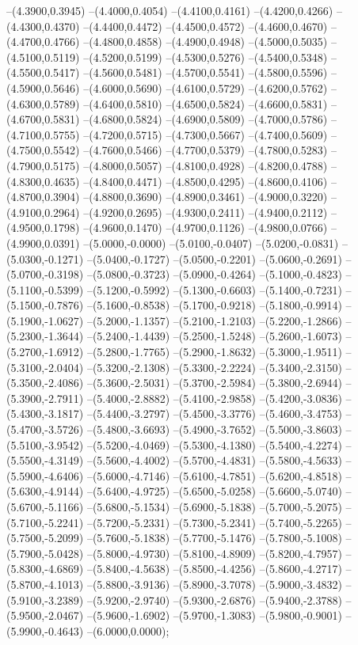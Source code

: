 	--(4.3900,0.3945)
	--(4.4000,0.4054)
	--(4.4100,0.4161)
	--(4.4200,0.4266)
	--(4.4300,0.4370)
	--(4.4400,0.4472)
	--(4.4500,0.4572)
	--(4.4600,0.4670)
	--(4.4700,0.4766)
	--(4.4800,0.4858)
	--(4.4900,0.4948)
	--(4.5000,0.5035)
	--(4.5100,0.5119)
	--(4.5200,0.5199)
	--(4.5300,0.5276)
	--(4.5400,0.5348)
	--(4.5500,0.5417)
	--(4.5600,0.5481)
	--(4.5700,0.5541)
	--(4.5800,0.5596)
	--(4.5900,0.5646)
	--(4.6000,0.5690)
	--(4.6100,0.5729)
	--(4.6200,0.5762)
	--(4.6300,0.5789)
	--(4.6400,0.5810)
	--(4.6500,0.5824)
	--(4.6600,0.5831)
	--(4.6700,0.5831)
	--(4.6800,0.5824)
	--(4.6900,0.5809)
	--(4.7000,0.5786)
	--(4.7100,0.5755)
	--(4.7200,0.5715)
	--(4.7300,0.5667)
	--(4.7400,0.5609)
	--(4.7500,0.5542)
	--(4.7600,0.5466)
	--(4.7700,0.5379)
	--(4.7800,0.5283)
	--(4.7900,0.5175)
	--(4.8000,0.5057)
	--(4.8100,0.4928)
	--(4.8200,0.4788)
	--(4.8300,0.4635)
	--(4.8400,0.4471)
	--(4.8500,0.4295)
	--(4.8600,0.4106)
	--(4.8700,0.3904)
	--(4.8800,0.3690)
	--(4.8900,0.3461)
	--(4.9000,0.3220)
	--(4.9100,0.2964)
	--(4.9200,0.2695)
	--(4.9300,0.2411)
	--(4.9400,0.2112)
	--(4.9500,0.1798)
	--(4.9600,0.1470)
	--(4.9700,0.1126)
	--(4.9800,0.0766)
	--(4.9900,0.0391)
	--(5.0000,-0.0000)
	--(5.0100,-0.0407)
	--(5.0200,-0.0831)
	--(5.0300,-0.1271)
	--(5.0400,-0.1727)
	--(5.0500,-0.2201)
	--(5.0600,-0.2691)
	--(5.0700,-0.3198)
	--(5.0800,-0.3723)
	--(5.0900,-0.4264)
	--(5.1000,-0.4823)
	--(5.1100,-0.5399)
	--(5.1200,-0.5992)
	--(5.1300,-0.6603)
	--(5.1400,-0.7231)
	--(5.1500,-0.7876)
	--(5.1600,-0.8538)
	--(5.1700,-0.9218)
	--(5.1800,-0.9914)
	--(5.1900,-1.0627)
	--(5.2000,-1.1357)
	--(5.2100,-1.2103)
	--(5.2200,-1.2866)
	--(5.2300,-1.3644)
	--(5.2400,-1.4439)
	--(5.2500,-1.5248)
	--(5.2600,-1.6073)
	--(5.2700,-1.6912)
	--(5.2800,-1.7765)
	--(5.2900,-1.8632)
	--(5.3000,-1.9511)
	--(5.3100,-2.0404)
	--(5.3200,-2.1308)
	--(5.3300,-2.2224)
	--(5.3400,-2.3150)
	--(5.3500,-2.4086)
	--(5.3600,-2.5031)
	--(5.3700,-2.5984)
	--(5.3800,-2.6944)
	--(5.3900,-2.7911)
	--(5.4000,-2.8882)
	--(5.4100,-2.9858)
	--(5.4200,-3.0836)
	--(5.4300,-3.1817)
	--(5.4400,-3.2797)
	--(5.4500,-3.3776)
	--(5.4600,-3.4753)
	--(5.4700,-3.5726)
	--(5.4800,-3.6693)
	--(5.4900,-3.7652)
	--(5.5000,-3.8603)
	--(5.5100,-3.9542)
	--(5.5200,-4.0469)
	--(5.5300,-4.1380)
	--(5.5400,-4.2274)
	--(5.5500,-4.3149)
	--(5.5600,-4.4002)
	--(5.5700,-4.4831)
	--(5.5800,-4.5633)
	--(5.5900,-4.6406)
	--(5.6000,-4.7146)
	--(5.6100,-4.7851)
	--(5.6200,-4.8518)
	--(5.6300,-4.9144)
	--(5.6400,-4.9725)
	--(5.6500,-5.0258)
	--(5.6600,-5.0740)
	--(5.6700,-5.1166)
	--(5.6800,-5.1534)
	--(5.6900,-5.1838)
	--(5.7000,-5.2075)
	--(5.7100,-5.2241)
	--(5.7200,-5.2331)
	--(5.7300,-5.2341)
	--(5.7400,-5.2265)
	--(5.7500,-5.2099)
	--(5.7600,-5.1838)
	--(5.7700,-5.1476)
	--(5.7800,-5.1008)
	--(5.7900,-5.0428)
	--(5.8000,-4.9730)
	--(5.8100,-4.8909)
	--(5.8200,-4.7957)
	--(5.8300,-4.6869)
	--(5.8400,-4.5638)
	--(5.8500,-4.4256)
	--(5.8600,-4.2717)
	--(5.8700,-4.1013)
	--(5.8800,-3.9136)
	--(5.8900,-3.7078)
	--(5.9000,-3.4832)
	--(5.9100,-3.2389)
	--(5.9200,-2.9740)
	--(5.9300,-2.6876)
	--(5.9400,-2.3788)
	--(5.9500,-2.0467)
	--(5.9600,-1.6902)
	--(5.9700,-1.3083)
	--(5.9800,-0.9001)
	--(5.9900,-0.4643)
	--(6.0000,0.0000);
